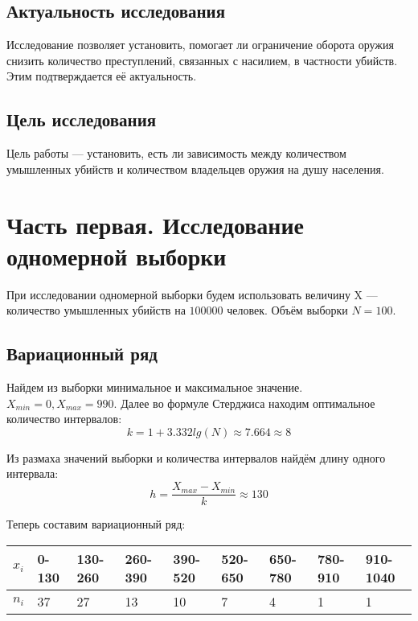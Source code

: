 \documentclass[titlepage]{article}
\begin{document}
\subsection{Актуальность исследования}

Исследование позволяет установить, помогает ли ограничение оборота оружия снизить количество преступлений, связанных с насилием,
в частности убийств. Этим подтверждается её актуальность.

\subsection{Цель исследования}

Цель работы --- установить, есть ли зависимость между количеством умышленных убийств и количеством владельцев оружия на душу населения.

\section{Часть первая. Исследование одномерной выборки}

При исследовании одномерной выборки будем использовать величину X --- количество умышленных убийств на $100 000$ человек.
Объём выборки $N = 100$.

\subsection{Вариационный ряд}

Найдем из выборки минимальное и максимальное значение. $X_{min} = 0, X_{max} = 990$. Далее во формуле Стерджиса находим оптимальное количество интервалов:
\begin{equation*}
k = 1 + 3.332lg(N) \approx 7.664 \approx 8
\end{equation*}

Из размаха значений выборки и количества интервалов найдём длину одного интервала:
\begin{equation*}
h = \frac{X_{max} - X_{min}}{k} \approx 130
\end{equation*}

Теперь составим вариационный ряд:
\begin{table}[!ht]
    \centering
    \begin{tabular}{|l|l|l|l|l|l|l|l|l|}
    \hline
        $x_i$ & 0-130 & 130-260 & 260-390 & 390-520 & 520-650 & 650-780 & 780-910 & 910-1040 \\ \hline
        $n_i$ & 37 & 27 & 13 & 10 & 7 & 4 & 1 & 1 \\ \hline
    \end{tabular}
\end{table}
\end{document}
